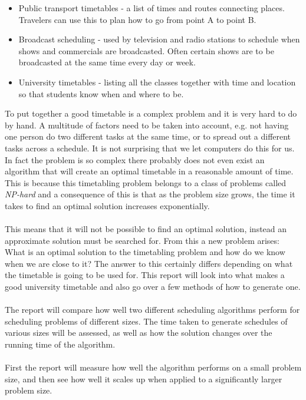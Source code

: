 \documentclass[titlepage,a4paper]{article}
\begin{document}
\begin{itemize}

  \item Public transport timetables - a list of times and routes connecting places. Travelers can use this to plan how to go from point A to point B.
  \item Broadcast scheduling - used by television and radio stations to schedule when shows and commercials are broadcasted. Often certain shows are to be broadcasted at the same time every day or week.
  \item University timetables - listing all the classes together with time and location so that students know when and where to be. 

\end{itemize}
To put together a good timetable is a complex problem and it is very hard to do by hand. A multitude of factors need to be taken into account, e.g. not having one person do two different tasks at the same time, or to spread out a different tasks across a schedule. It is not surprising that we let computers do this for us. In fact the problem is so complex there probably does not even exist an algorithm that will create an optimal timetable in a reasonable amount of time. This is because this timetabling problem belongs to a class of problems called \emph{NP-hard}\cite{guidedSearch09}  and a consequence of this is that as the problem size grows, the time it takes to find an optimal solution increases exponentially. \\\\
This means that it will not be possible to find an optimal solution, instead an approximate solution must be searched for. From this a new problem arises: What is an optimal solution to the timetabling problem and how do we know when we are close to it? The answer to this certainly differs depending on what the timetable is going to be used for. This report will look into what makes a good university timetable and also go over a few methods of how to generate one. \\\\
The report will compare how well two different scheduling algorithms perform for scheduling problems of different sizes. The time taken to generate schedules of various sizes will be assessed, as well as how the solution changes over the running time of the algorithm. \\\\
First the report will measure how well the algorithm performs on a small problem size, and then see how well it scales up when applied to a significantly larger problem size. \\\\
\end{document}
